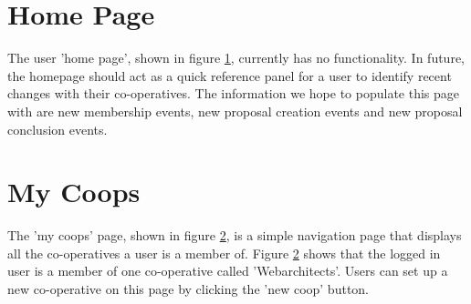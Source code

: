 \section{Home Page}

\begin{figure}
\centering
{}
\decoRule
\caption[]{}
\label{fig:homepage}
\end{figure}

The user 'home page', shown in figure \ref{fig:homepage}, currently has no functionality. In future, the homepage should act as a quick reference panel for a user to identify recent changes with their co-operatives. The information we hope to populate this page with are new membership events, new proposal creation events and new proposal conclusion events.\\
 
\section{My Coops}

\begin{figure}
\centering
{}
\decoRule
\caption[]{}
\label{fig:coopspage}
\end{figure}

The 'my coops' page, shown in figure \ref{fig:coopspage}, is a simple navigation page that displays all the co-operatives a user is a member of. Figure \ref{fig:coopspage} shows that the logged in user is a member of one co-operative called 'Webarchitects'. Users can set up a new co-operative on this page by clicking the 'new coop' button.\\

